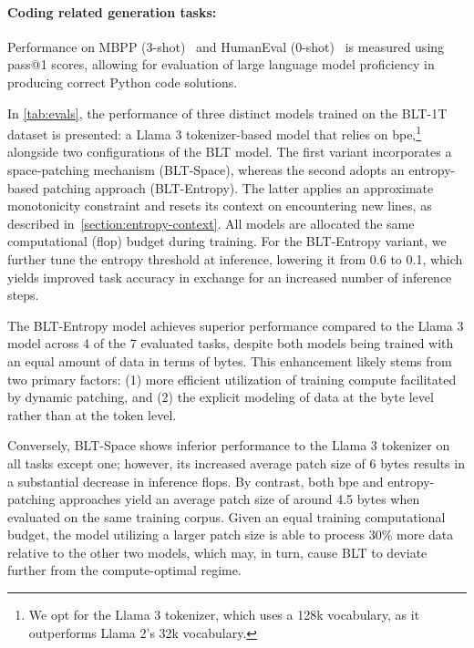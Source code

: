 \paragraph{Coding related generation tasks:} Performance on MBPP (3-shot)~\citep{Eval_MBPP} and HumanEval (0-shot)~\citep{Eval_HumanEval} is measured using pass@1 scores, allowing for evaluation of large language model proficiency in producing correct Python code solutions.

In \autoref{tab:evals}, the performance of three distinct models trained on the {\textsc BLT}-1T dataset is presented: a Llama 3 tokenizer-based model that relies on bpe,\footnote{We opt for the Llama 3 tokenizer, which uses a 128k vocabulary, as it outperforms Llama 2’s 32k vocabulary.} alongside two configurations of the {\textsc BLT} model. The first variant incorporates a space-patching mechanism ({\textsc BLT}-Space), whereas the second adopts an entropy-based patching approach ({\textsc BLT}-Entropy). The latter applies an approximate monotonicity constraint and resets its context on encountering new lines, as described in~\autoref{section:entropy-context}. All models are allocated the same computational (flop) budget during training. For the {\textsc BLT}-Entropy variant, we further tune the entropy threshold at inference, lowering it from 0.6 to 0.1, which yields improved task accuracy in exchange for an increased number of inference steps.

The {\textsc BLT}-Entropy model achieves superior performance compared to the Llama 3 model across 4 of the 7 evaluated tasks, despite both models being trained with an equal amount of data in terms of bytes. This enhancement likely stems from two primary factors: (1) more efficient utilization of training compute facilitated by dynamic patching, and (2) the explicit modeling of data at the byte level rather than at the token level.

Conversely, {\textsc BLT}-Space shows inferior performance to the Llama 3 tokenizer on all tasks except one; however, its increased average patch size of 6 bytes results in a substantial decrease in inference flops. By contrast, both bpe and entropy-patching approaches yield an average patch size of around 4.5 bytes when evaluated on the same training corpus. Given an equal training computational budget, the model utilizing a larger patch size is able to process 30\% more data relative to the other two models, which may, in turn, cause {\textsc BLT} to deviate further from the compute-optimal regime.

